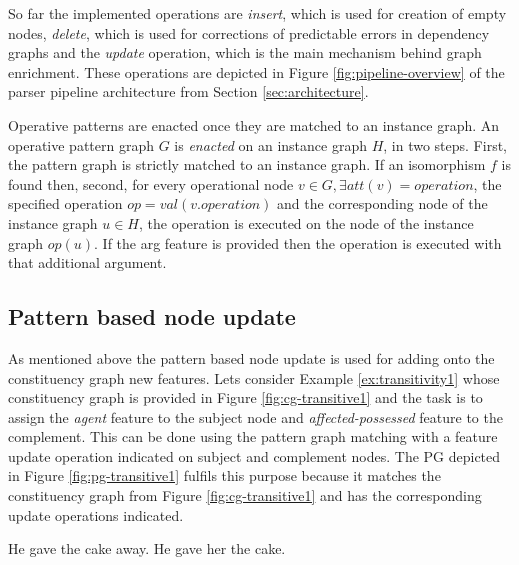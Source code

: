     So far the implemented operations are \textit{insert}, which is used for creation of empty nodes, \textit{delete}, which is used for corrections of predictable errors in dependency graphs and the \textit{update} operation, which is the main mechanism behind graph enrichment. These operations are depicted in Figure \ref{fig:pipeline-overview} of the parser pipeline architecture from Section \ref{sec:architecture}.

    Operative patterns are enacted once they are matched to an instance graph. An operative pattern graph $G$ is \textit{enacted} on an instance graph $H$, in two steps. First, the pattern graph is strictly matched to an instance graph. If an isomorphism $f$ is found then, second, for every operational node $v \in G, \exists att(v)=operation$, the specified operation $op = val(v.operation)$ and the corresponding node of the instance graph $u \in H$, the operation is executed on the node of the instance graph $op(u)$. If the arg feature is provided then the operation is executed with that additional argument. 

\subsection{Pattern based node update} 

    As mentioned above the pattern based node update is used for adding onto the constituency graph new features. Lets consider Example \ref{ex:transitivity1} whose constituency graph is provided in Figure \ref{fig:cg-transitive1} and the task is to assign the \textit{agent} feature to the subject node and \textit{affected-possessed} feature to the complement. This can be done using the pattern graph matching with a feature update operation indicated on subject and complement nodes. The PG depicted in Figure \ref{fig:pg-transitive1} fulfils this purpose because it matches the constituency graph from Figure \ref{fig:cg-transitive1} and has the corresponding update operations indicated.

    \begin{exe}
        \ex\label{ex:transitivity1} He gave the cake away.
        \ex\label{ex:transitivity2} He gave her the cake.
    \end{exe}

    
